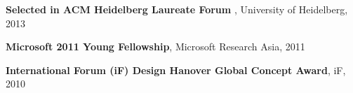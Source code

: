 \documentclass[margin,line]{res}
\begin{document}
\begin{resume}
%

\textbf{Selected in ACM Heidelberg Laureate Forum }, University of Heidelberg, 2013


\textbf{Microsoft 2011 Young Fellowship}, Microsoft Research Asia, 2011


\textbf{International Forum (iF) Design Hanover Global Concept Award}, iF, 2010 






%
%
%     
%
%
%	
%	
%
%



\end{resume}
\end{document}
